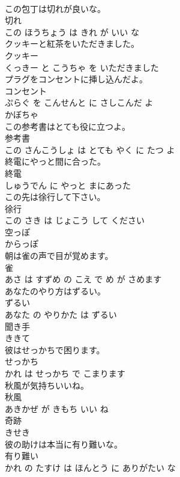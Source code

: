 \documentclass[8pt]{extreport}
\begin{document}
\begin{CJK}{UTF8}{min}
\\	この包丁は切れが良いな。	
\\	切れ 
\\	この ほうちょう は きれ が いい な			
\\	クッキーと紅茶をいただきました。	
\\	クッキー 
\\	くっきー と こうちゃ を いただきました			
\\	プラグをコンセントに挿し込んだよ。	
\\	コンセント 
\\	ぷらぐ を こんせんと に さしこんだ よ			
\\	かぼちゃ	
\\	この参考書はとても役に立つよ。	
\\	参考書 
\\	この さんこうしょ は とても やく に たつ よ			
\\	終電にやっと間に合った。	
\\	終電 
\\	しゅうでん に やっと まにあった			
\\	この先は徐行して下さい。	
\\	徐行 
\\	この さき は じょこう して ください			
\\	空っぽ	
\\	からっぽ			
\\	朝は雀の声で目が覚めます。	
\\	雀 
\\	あさ は すずめ の こえ で め が さめます			
\\	あなたのやり方はずるい。	
\\	ずるい 
\\	あなた の やりかた は ずるい			
\\	聞き手	
\\	ききて			
\\	彼はせっかちで困ります。	
\\	せっかち 
\\	かれ は せっかち で こまります			
\\	秋風が気持ちいいね。	
\\	秋風 
\\	あきかぜ が きもち いい ね			
\\	奇跡	
\\	きせき			
\\	彼の助けは本当に有り難いな。	
\\	有り難い 
\\	かれ の たすけ は ほんとう に ありがたい な			

\end{CJK}
\end{document}
